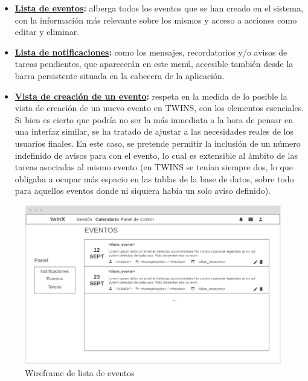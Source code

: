 \begin{itemize}
	\item \textbf{\hyperref[fig:eventos_listaWF]{Lista de eventos}:} alberga todos los eventos que se han creado en el sistema, con la información más relevante sobre los mismos y acceso a acciones como editar y eliminar.
	\item \textbf{\hyperref[fig:notificaciones_listaWF]{Lista de notificaciones}:} como los mensajes, recordatorios y/o avisos de tareas pendientes, que aparecerán en este menú, accesible también desde la barra persistente situada en la cabecera de la aplicación.
	\item \textbf{\hyperref[fig:nuevo_eventoWF]{Vista de creación de un evento}:} respeta en la medida de lo posible la vista de creación de un nuevo evento en TWINS, con los elementos esenciales. Si bien es cierto que podría no ser la más inmediata a la hora de pensar en una interfaz similar, se ha tratado de ajustar a las necesidades reales de los usuarios finales. En este caso, se pretende permitir la inclusión de un número indefinido de avisos para con el evento, lo cual es extensible al ámbito de las tareas asociadas al mismo evento (en TWINS se tenían siempre dos, lo que obligaba a ocupar más espacio en las tablas de la base de datos, sobre todo para aquellos eventos donde ni siquiera había un solo aviso definido).	
\end{itemize}

\begin{figure}
	\centering
	\includegraphics[width=\textwidth]{img/Wireframes/Calendario/eventos_lista.png}
	\caption{Wireframe de lista de eventos}
	\label{fig:eventos_listaWF}
\end{figure}

